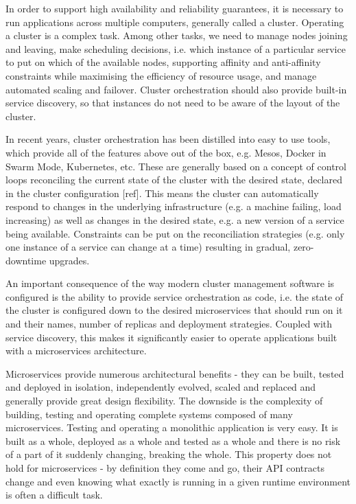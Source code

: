 \documentclass[reprint,amsmath,amssymb,aps]{revtex4-1}
\begin{document}
In order to support high availability and reliability guarantees, it is necessary to run applications across multiple computers, generally called a cluster. Operating a cluster is a complex task. Among other tasks, we need to manage nodes joining and leaving, make scheduling decisions, i.e. which instance of a particular service to put on which of the available nodes, supporting affinity and anti-affinity constraints while maximising the efficiency of resource usage, and manage automated scaling and failover. Cluster orchestration should also provide built-in service discovery, so that instances do not need to be aware of the layout of the cluster.

In recent years, cluster orchestration has been distilled into easy to use tools, which provide all of the features above out of the box, e.g. Mesos, Docker in Swarm Mode, Kubernetes, etc. These are generally based on a concept of control loops reconciling the current state of the cluster with the desired state, declared in the cluster configuration [ref]. This means the cluster can automatically respond to changes in the underlying infrastructure (e.g. a machine failing, load increasing) as well as changes in the desired state, e.g. a new version of a service being available. Constraints can be put on the reconciliation strategies (e.g. only one instance of a service can change at a time) resulting in gradual, zero-downtime upgrades.

An important consequence of the way modern cluster management software is configured is the ability to provide service orchestration as code, i.e. the state of the cluster is configured down to the desired microservices that should run on it and their names, number of replicas and deployment strategies. Coupled with service discovery, this makes it significantly easier to operate applications built with a microservices architecture. 

Microservices provide numerous architectural benefits - they can be built, tested and deployed in isolation, independently evolved, scaled and replaced and generally provide great design flexibility. The downside is the complexity of building, testing and operating complete systems composed of many microservices. Testing and operating a monolithic application is very easy. It is built as a whole, deployed as a whole and tested as a whole and there is no risk of a part of it suddenly changing, breaking the whole. This property does not hold for microservices - by definition they come and go, their API contracts change and even knowing what exactly is running in a given runtime environment is often a difficult task.
\end{document}
